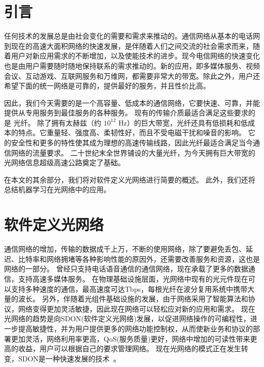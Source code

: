 \documentclass[degree=project,degree-type=project,cjk-font=noto]{thuthesis}
\begin{document}
\maketitle

\frontmatter
% 

\tableofcontents

\mainmatter

\chapter{引言}

任何技术的发展总是由社会变化的需要和需求来推动的。通信网络从基本的电话网到现在的高速大面积网络的快速发展，是伴随着人们之间交流的社会需求而来，随着用户对新应用需求的不断增加，以及使能技术的进步。现今电信网络的快速变化也是由用户需要随时随地保持联系的需求推动的。新的应用，即多媒体服务、视频会议、互动游戏、互联网服务和万维网，都需要非常大的带宽。除此之外，用户还希望下面的统一网络是可靠的，提供最好的服务，并且性价比高。

因此，我们今天需要的是一个高容量、低成本的通信网络，它要快速、可靠，并能提供从专用服务到最佳服务的各种服务。
现有的传输介质最适合满足这些要求的是 {\heiti 光纤}。
除了拥有太赫兹（约 $10^{12}$ Hz）的巨大带宽，光纤还具有低损耗和低成本的特点。它重量轻、强度高、柔韧性好，而且不受电磁干扰和噪音的影响。 它的安全性和更多的特性使其成为理想的高速传输线路，因此光纤最适合满足当今通信网络的流量要求。 二十世纪末全世界铺设的大量光纤，为今天拥有巨大带宽的光网络信息超级高速公路奠定了基础。

在本文的其余部分，我们将对软件定义光网络进行简要的概述。
此外，我们还将总结机器学习在光网络中的应用。

\chapter{软件定义光网络}
通信网络的增加，传输的数据成千上万，不断的使用网络，除了要避免丢包、延迟、比特率和网络拥堵等各种影响性能的原因外，还需要改善服务和资源，这也是网络的一部分。
曾经只支持电话语音通信的通信网络，现在承载了更多的数据通信，支持高速多媒体服务。
在物理基础设施层面，光网络中现有的光元件现在可以支持多种速度的通信，最高速度可达Tbps，每根光纤在波分复用系统中携带大量的波长。
另外，伴随着光组件基础设施的发展，由于网络采用了智能算法和协议，网络变得更加灵活敏捷，因此现在网络可以轻松应对新的应用和需求。
现在光网络的趋势是向SDON(软件定义光网络)发展，以促进网络操作的可编程性，进一步提高敏捷性，并为用户提供更多的网络功能控制权，从而使新业务和协议的部署更加灵活，网络利用率更高，QoS(服务质量)更好，网络中增加的可读性带来更高的收益，用户可以根据自己的要求管理网络。
现在光网络的模式正在发生转变，SDON是一种快速发展的技术~\cite{SDN,SDON}。
\end{document}
